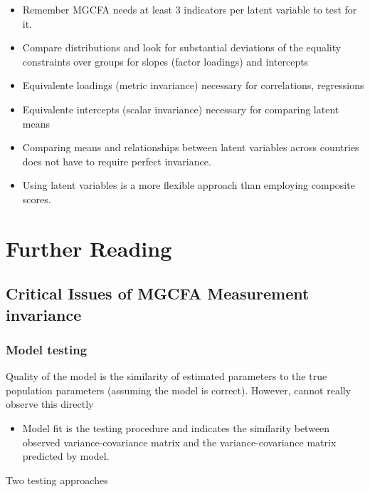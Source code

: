 \documentclass[
]{book}
\providecommand{\tightlist}{%
  \setlength{\itemsep}{0pt}\setlength{\parskip}{0pt}}
\begin{document}
\begin{itemize}
\item
  Remember MGCFA needs at least 3 indicators per latent variable to test for it.
\item
  Compare distributions and look for substantial deviations of the equality constraints over groups for slopes (factor loadings) and intercepts
\item
  Equivalente loadings (metric invariance) necessary for correlations, regressions
\item
  Equivalente intercepts (scalar invariance) necessary for comparing latent means
\item
  Comparing means and relationships between latent variables across countries does not have to require perfect invariance.
\item
  Using latent variables is a more flexible approach than employing composite scores.
\end{itemize}

\hypertarget{further-reading}{%
\chapter{Further Reading}\label{further-reading}}

\hypertarget{critical-issues-of-mgcfa-measurement-invariance}{%
\section{Critical Issues of MGCFA Measurement invariance}\label{critical-issues-of-mgcfa-measurement-invariance}}

\hypertarget{model-testing}{%
\subsection{Model testing}\label{model-testing}}

Quality of the model is the similarity of estimated parameters to the true population parameters (assuming the model is correct). However, cannot really observe this directly

\begin{itemize}
\tightlist
\item
  Model fit is the testing procedure and indicates the similarity between observed variance-covariance matrix and the variance-covariance matrix predicted by model.
\end{itemize}

Two testing approaches
\end{document}
